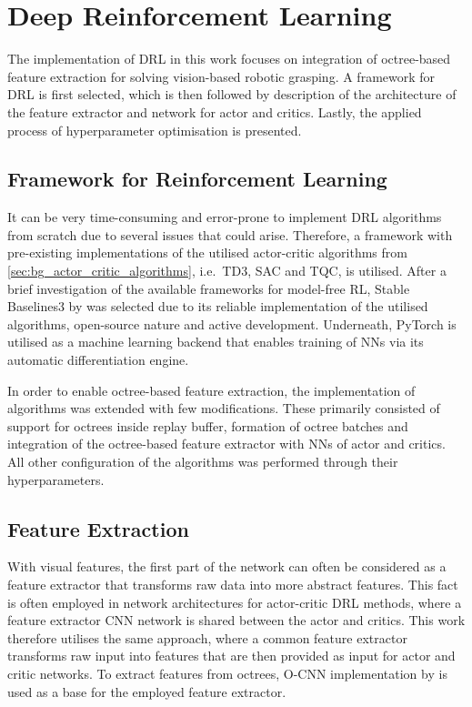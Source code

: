 \section{Deep Reinforcement Learning}

The implementation of DRL in this work focuses on integration of octree-based feature extraction for solving vision-based robotic grasping. A framework for DRL is first selected, which is then followed by description of the architecture of the feature extractor and network for actor and critics. Lastly, the applied process of hyperparameter optimisation is presented.


\subsection{Framework for Reinforcement Learning}

It can be very time-consuming and error-prone to implement DRL algorithms from scratch due to several issues that could arise. Therefore, a framework with pre-existing implementations of the utilised actor-critic algorithms from \autoref{sec:bg_actor_critic_algorithms}, i.e.~TD3, SAC and TQC, is utilised. After a brief investigation of the available frameworks for model-free RL, Stable Baselines3 by \citet{raffin_stable-baselines3_2019} was selected due to its reliable implementation of the utilised algorithms, open-source nature and active development. Underneath, PyTorch \cite{paszke_pytorch_2019} is utilised as a machine learning backend that enables training of NNs via its automatic differentiation engine.

In order to enable octree-based feature extraction, the implementation of algorithms was extended with few modifications. These primarily consisted of support for octrees inside replay buffer, formation of octree batches and integration of the octree-based feature extractor with NNs of actor and critics. All other configuration of the algorithms was performed through their hyperparameters.


\subsection{Feature Extraction}\label{subsec:feature_extraction}

With visual features, the first part of the network can often be considered as a feature extractor that transforms raw data into more abstract features. This fact is often employed in network architectures for actor-critic DRL methods, where a feature extractor CNN network is shared between the actor and critics. This work therefore utilises the same approach, where a common feature extractor transforms raw input into features that are then provided as input for actor and critic networks. To extract features from octrees, O-CNN implementation by \cite{wang_o-cnn_2017} is used as a base for the employed feature extractor.


